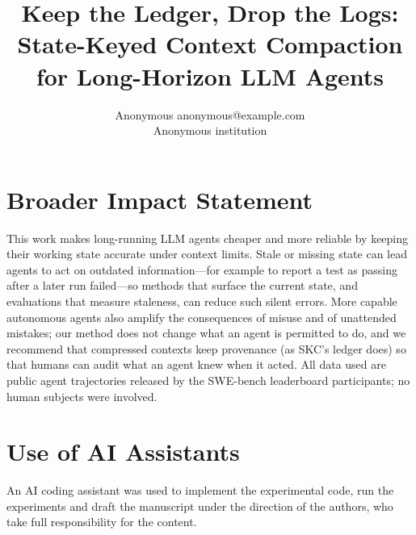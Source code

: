 \documentclass[10pt]{article}
\title{Keep the Ledger, Drop the Logs:\\State-Keyed Context Compaction for Long-Horizon LLM Agents}
\author{\name Anonymous \email anonymous@example.com \\
      \addr Anonymous institution}
\theoremstyle{definition}
\begin{document}
\maketitle





\section*{Broader Impact Statement}
This work makes long-running LLM agents cheaper and more reliable by keeping
their working state accurate under context limits. Stale or missing state can
lead agents to act on outdated information---for example to report a test as
passing after a later run failed---so methods that surface the current state,
and evaluations that measure staleness, can reduce such silent errors. More
capable autonomous agents also amplify the consequences of misuse and of
unattended mistakes; our method does not change what an agent is permitted to
do, and we recommend that compressed contexts keep provenance (as SKC's ledger
does) so that humans can audit what an agent knew when it acted. All data used
are public agent trajectories released by the SWE-bench leaderboard
participants; no human subjects were involved.

\section*{Use of AI Assistants}
An AI coding assistant was used to implement the experimental code, run the
experiments and draft the manuscript under the direction of the authors, who
take full responsibility for the content.




\clearpage
\appendix


\end{document}
